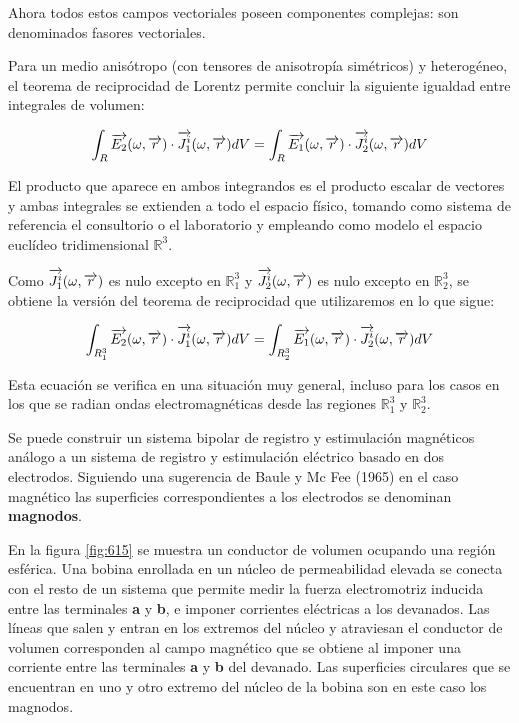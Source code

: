 Ahora todos estos campos vectoriales poseen componentes complejas: son denominados fasores vectoriales.



Para un medio anisótropo (con tensores de anisotropía simétricos) y heterogéneo, el teorema de reciprocidad de Lorentz permite concluir la siguiente igualdad entre integrales de volumen:

\begin{equation}
	\int_{R}\overrightarrow{E_{2}}(\omega,\overrightarrow{r}) \cdot \overrightarrow{J_{1}^{i}}(\omega,\overrightarrow{r}) dV = 
	\int_{R}\overrightarrow{E_{1}}(\omega,\overrightarrow{r}) \cdot \overrightarrow{J_{2}^{i}}(\omega,\overrightarrow{r}) dV
\end{equation}

El producto que aparece en ambos integrandos es el producto escalar de vectores y ambas integrales se extienden a todo el espacio físico, tomando como sistema de referencia el consultorio o el laboratorio y empleando como modelo el espacio euclídeo tridimensional ${\mathbb{R}}^{3}$.

Como $\overrightarrow{J_{1}^{i}}(\omega,\overrightarrow{r})$ es nulo excepto en ${\mathbb{R}^{3}_{1}}$ y $\overrightarrow{J_{2}^{i}}(\omega,\overrightarrow{r})$ es nulo excepto en  ${\mathbb{R}^{3}_{2}}$, se obtiene la versión del teorema de reciprocidad que utilizaremos en lo que sigue:

\begin{equation}
	\int_{R^{3}_{1}}\overrightarrow{E_{2}}(\omega,\overrightarrow{r}) \cdot \overrightarrow{J_{1}^{i}}(\omega,\overrightarrow{r}) dV = 
	\int_{R^{3}_{2}}\overrightarrow{E_{1}}(\omega,\overrightarrow{r}) \cdot \overrightarrow{J_{2}^{i}}(\omega,\overrightarrow{r}) dV
\end{equation}

Esta ecuación se verifica en una situación muy general, incluso para los casos en los que se radian ondas electromagnéticas desde las regiones $\mathbb{R}^{3}_{1}$ y $\mathbb{R}^{3}_{2}$.

Se puede construir un sistema bipolar de registro y estimulación magnéticos análogo a un sistema de registro y estimulación eléctrico basado en dos electrodos.
Siguiendo una sugerencia de Baule y Mc Fee (1965) \citep{Baule_1965} en el caso magnético las superficies correspondientes a los electrodos se denominan \textbf{magnodos}.

En la figura \ref{fig:615} se muestra un conductor de volumen ocupando una región esférica.
Una bobina enrollada en un núcleo de permeabilidad elevada se conecta con el resto de un sistema que permite medir la fuerza electromotriz inducida entre las terminales \textbf{a} y \textbf{b}, e imponer corrientes eléctricas a los devanados. Las líneas que salen y entran en los extremos del núcleo y atraviesan el conductor de volumen corresponden al campo magnético que se obtiene al imponer una corriente entre las terminales \textbf{a} y \textbf{b} del devanado.
Las superficies circulares que se encuentran en uno y otro extremo del núcleo de la bobina son en este caso los magnodos.

